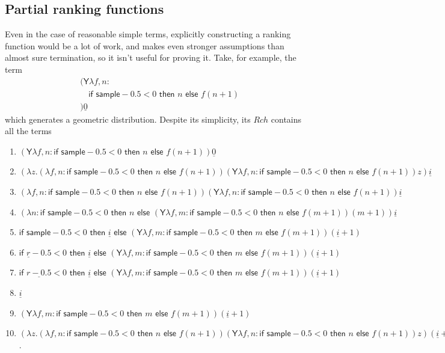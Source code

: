 \documentclass{article}
\newcommand{\tY}{\textsf{Y}}
\newcommand{\tif}[3]{\textsf{if }#1\textsf{ then }#2\textsf{ else }#3}
\newcommand{\tsample}{\textsf{sample}}
\theoremstyle{definition}
\theoremstyle{lemma}
\theoremstyle{remark}
\begin{document}
\subsection{Partial ranking functions}
Even in the case of reasonable simple terms, explicitly constructing a ranking function would be a lot of work, and  makes even stronger assumptions than almost sure termination, so it isn't useful for proving it. Take, for example, the term
\begin{align*}
&(\tY \lambda f, n: \\
&\quad \tif{\tsample - 0.5 < 0}{n}{f (n+1)} \\
&) \underline{0}
\end{align*}
which generates a geometric distribution.
    Despite its simplicity, its $Rch$ contains all the terms
\begin{enumerate}
    \item $(\tY \lambda f, n: \tif{\tsample - 0.5 < 0}{n}{f (n+1)}) \underline{0}$
    \item $(\lambda z.(\lambda f, n: \tif{\tsample - 0.5 < 0}{n}{f (n+1)}) (\tY \lambda f, n: \tif{\tsample - 0.5 < 0}{n}{f (n+1)}) z) \underline{i}$
    \item $(\lambda f, n: \tif{\tsample - 0.5 < 0}{n}{f (n+1)}) (\tY \lambda f, n: \tif{\tsample - 0.5 < 0}{n}{f (n+1)}) \underline{i}$
    \item $(\lambda n: \tif{\tsample - 0.5 < 0}{n}{(\tY \lambda f, m: \tif{\tsample - 0.5 < 0}{n}{f (m+1)}) (m+1)}) \underline{i}$
    \item $\tif{\tsample - 0.5 < 0}{\underline{i}}{(\tY \lambda f, m: \tif{\tsample - 0.5 < 0}{m}{f (m+1)}) (\underline{i}+1)}$
    \item $\tif{\underline r - 0.5 < 0}{\underline{i}}{(\tY \lambda f, m: \tif{\tsample - 0.5 < 0}{m}{f (m+1)}) (\underline{i}+1)}$
    \item $\tif{\underline{r - 0.5} < 0}{\underline{i}}{(\tY \lambda f, m: \tif{\tsample - 0.5 < 0}{m}{f (m+1)}) (\underline{i}+1)}$
    \item $\underline{i}$
    \item $(\tY \lambda f, m: \tif{\tsample - 0.5 < 0}{m}{f (m+1)}) (\underline{i}+1)$
    \item $(\lambda z.(\lambda f, n: \tif{\tsample - 0.5 < 0}{n}{f (n+1)}) (\tY \lambda f, n: \tif{\tsample - 0.5 < 0}{n}{f (n+1)}) z) (\underline{i} + 1)$.
\end{enumerate}
\end{document}

